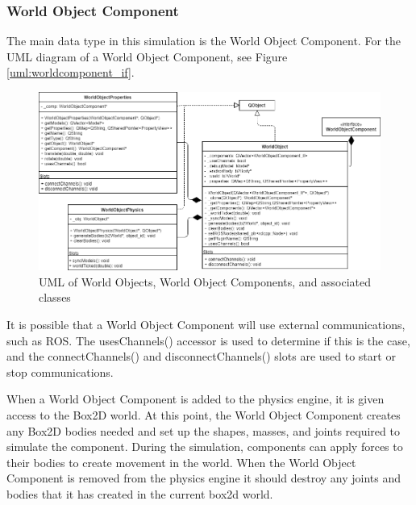   \subsubsection*{World Object Component\label{sec:worldobjclass}}
	The main data type in this simulation is the World Object Component. For the UML diagram of a World Object Component, see Figure \ref{uml:worldcomponent_if}.
	
 \begin{figure}[h]
 	\begin{center}
 	\includegraphics[scale=0.5]{./images_design/uml/WorldObj}
 	\caption{UML of World Objects, World Object Components, and associated classes\label{uml:worldobj}}
 	\end{center}
 \end{figure}
	
	It is possible that a World Object Component will use external communications, such as ROS. The usesChannels() accessor is used to determine if this is the case, and the connectChannels() and disconnectChannels() slots are used to start or stop communications.
	
	When a World Object Component is added to the physics engine, it is given access to the Box2D world. At this point, the World Object Component creates any Box2D bodies needed and set up the shapes, masses, and joints required to simulate the component. During the simulation, components can apply forces to their bodies to create movement in the world. When the World Object Component is removed from the physics engine it should destroy any joints and bodies that it has created in the current box2d world.

